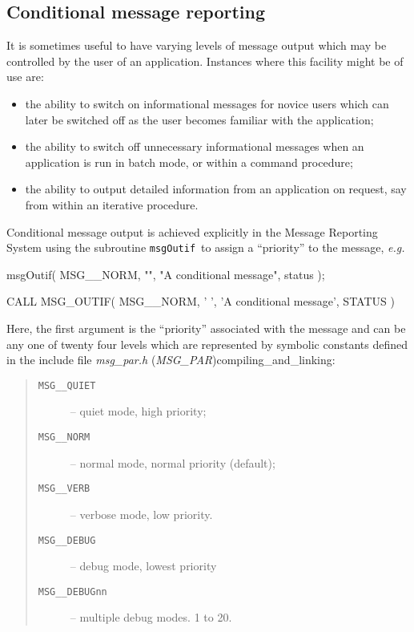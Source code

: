 \documentclass[twoside,11pt]{starlink}
\providecommand{\func}[1]{\texttt{#1}}
\providecommand{\const}[1]{\texttt{#1}}
\providecommand{\fname}[1]{\textit{#1}}
\providecommand{\msgnorm}{\const{MSG\_\_NORM}}
\providecommand{\msgverb}{\const{MSG\_\_VERB}}
\providecommand{\msgquiet}{\const{MSG\_\_QUIET}}
\providecommand{\msgdebug}{\const{MSG\_\_DEBUG}}
\providecommand{\msgoutif}{\func{msgOutif}}
\begin{document}
\subsection{Conditional message reporting}
It is sometimes useful to have varying levels of message output which
may be controlled by the user of an application.
Instances where this facility might be of use are:
\begin {itemize}
\item the ability to switch on informational messages for novice users
which can later be switched off as the user becomes familiar with
the application;
\item the ability to switch off unnecessary informational messages when
an application is run in batch mode, or within a command procedure;
\item the ability to output detailed information from an application on
request, say from within an iterative procedure.
\end {itemize}
Conditional message output is achieved explicitly in the Message Reporting
System using the subroutine \msgoutif\ to assign a ``priority'' to the
message, \textit{e.g.}
\begin {small}
\begin{terminalv}
      msgOutif( MSG__NORM, "", "A conditional message", status );

      CALL MSG_OUTIF( MSG__NORM, ' ', 'A conditional message', STATUS )
\end{terminalv}
\end {small}
Here, the first argument is the ``priority'' associated with the
message and can be any one of twenty four levels which are
represented by symbolic constants defined in the include file
\htmlref
{\fname{msg\_par.h} (\fname{MSG\_PAR})}{compiling_and_linking}:
\begin {quote}
\begin {description}
\item [\msgquiet] -- quiet mode, high priority;
\item [\msgnorm] -- normal mode, normal priority (default);
\item [\msgverb] -- verbose mode, low priority.
\item [\msgdebug] -- debug mode, lowest priority
\item [\const{MSG\_\_DEBUGnn}] -- multiple debug modes. 1 to 20.
\end {description}
\end {quote}
\end{document}
